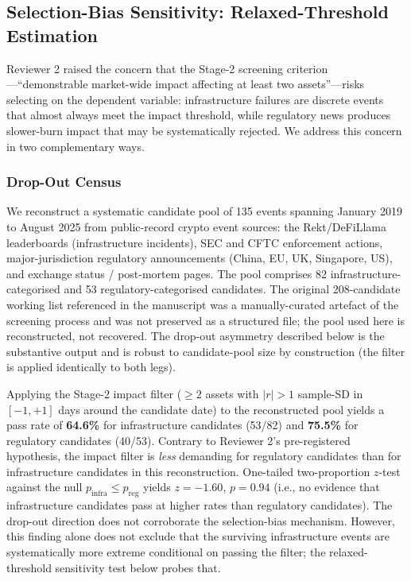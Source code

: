 \documentclass[pdflatex,sn-mathphys-num]{sn-jnl}
\theoremstyle{thmstyleone}
\theoremstyle{thmstyletwo}
\theoremstyle{thmstylethree}
\begin{document}

\subsection{Selection-Bias Sensitivity: Relaxed-Threshold Estimation}\label{sec:selection_bias}

Reviewer 2 raised the concern that the Stage-2 screening criterion---``demonstrable market-wide impact affecting at least two assets''---risks selecting on the dependent variable: infrastructure failures are discrete events that almost always meet the impact threshold, while regulatory news produces slower-burn impact that may be systematically rejected. We address this concern in two complementary ways.

\subsubsection{Drop-Out Census}

We reconstruct a systematic candidate pool of 135 events spanning January 2019 to August 2025 from public-record crypto event sources: the Rekt/DeFiLlama leaderboards (infrastructure incidents), SEC and CFTC enforcement actions, major-jurisdiction regulatory announcements (China, EU, UK, Singapore, US), and exchange status / post-mortem pages. The pool comprises 82 infrastructure-categorised and 53 regulatory-categorised candidates. The original 208-candidate working list referenced in the manuscript was a manually-curated artefact of the screening process and was not preserved as a structured file; the pool used here is reconstructed, not recovered. The drop-out asymmetry described below is the substantive output and is robust to candidate-pool size by construction (the filter is applied identically to both legs).

Applying the Stage-2 impact filter ($\geq 2$ assets with $|r| > 1$ sample-SD in $[-1, +1]$ days around the candidate date) to the reconstructed pool yields a pass rate of \textbf{64.6\%} for infrastructure candidates (53/82) and \textbf{75.5\%} for regulatory candidates (40/53). Contrary to Reviewer 2's pre-registered hypothesis, the impact filter is \textit{less} demanding for regulatory candidates than for infrastructure candidates in this reconstruction. One-tailed two-proportion $z$-test against the null $p_{\text{infra}} \leq p_{\text{reg}}$ yields $z = -1.60$, $p = 0.94$ (i.e., no evidence that infrastructure candidates pass at higher rates than regulatory candidates). The drop-out direction does not corroborate the selection-bias mechanism. However, this finding alone does not exclude that the surviving infrastructure events are systematically more extreme conditional on passing the filter; the relaxed-threshold sensitivity test below probes that.
\end{document}
